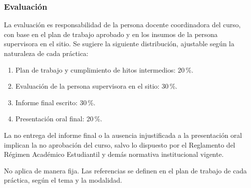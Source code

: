 \begin{refsection}
\subsubsection*{Evaluación}

La evaluación es responsabilidad de la persona docente coordinadora del curso, con base en el plan de trabajo aprobado y en los insumos de la persona supervisora en el sitio. Se sugiere la siguiente distribución, ajustable según la naturaleza de cada práctica:

\begin{enumerate}
\item Plan de trabajo y cumplimiento de hitos intermedios: 20\,\%.
\item Evaluación de la persona supervisora en el sitio: 30\,\%.
\item Informe final escrito: 30\,\%.
\item Presentación oral final: 20\,\%.
\end{enumerate}

La no entrega del informe final o la ausencia injustificada a la presentación oral implican la no aprobación del curso, salvo lo dispuesto por el Reglamento del Régimen Académico Estudiantil y demás normativa institucional vigente.

No aplica de manera fija. Las referencias se definen en el plan de trabajo de cada práctica, según el tema y la modalidad.

\printcursosbibliography

\end{refsection}
